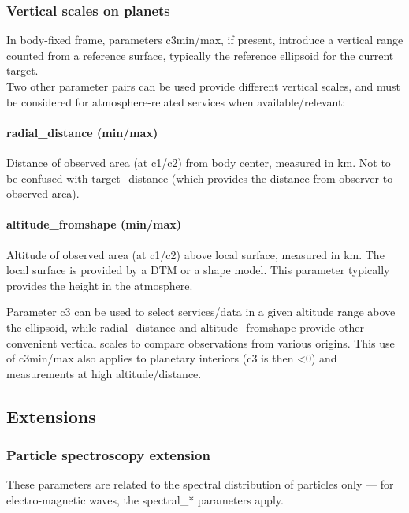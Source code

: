 \documentclass[11pt,a4paper]{ivoa}
\begin{document}
\subsubsection{Vertical scales on planets}

In body-fixed frame, parameters c3min/max, if present, introduce a
vertical range counted from a reference surface, typically the reference
ellipsoid for the current target. \\

Two other parameter pairs can be used provide different vertical
scales, and must be considered for atmosphere-related services when
available/relevant:

\paragraph{radial\_distance (min/max)}

Distance of observed area (at c1/c2) from body center, measured in km.
Not to be confused with target\_distance
(which provides the distance from observer to observed area).

\paragraph{altitude\_fromshape (min/max)}

Altitude of observed area (at c1/c2) above local surface, measured in km.
The local surface is provided by a DTM or a shape model.
This parameter typically provides the height in the atmosphere.

Parameter c3 can be used to select services/data in a given altitude
range above the ellipsoid, while radial\_distance and altitude\_fromshape
provide other convenient vertical scales to compare observations from
various origins. This use of c3min/max also applies to planetary interiors
(c3 is then <0) and measurements at high altitude/distance.

\subsection{Extensions}

\subsubsection{Particle spectroscopy extension}

These parameters are related to the spectral distribution of particles
only --- for electro-magnetic waves, the spectral\_* parameters apply.
\end{document}
